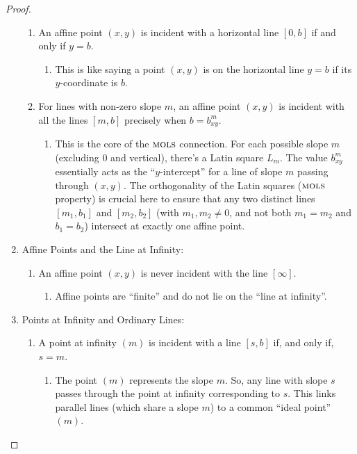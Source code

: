 \begin{proof}
\begin{enumerate}[1.]
\begin{enumerate}[-]
            \item An affine point $(x, y)$ is incident with a horizontal line $[0, b]$ if and only if $y = b$.
            \begin{enumerate}[$\to$]
                \item This is like saying a point $(x,y)$ is on the horizontal line $y=b$ if its $y$-coordinate is $b$.
            \end{enumerate}
            \item For lines with non-zero slope $m$, an affine point $(x, y)$ is incident with all the lines $[m, b]$ precisely when $b = b^m_{xy}$.
            \begin{enumerate}[$\to$]
                \item This is the core of the $\operatorname{\textsc{mols}}$ connection. For each possible slope $m$ (excluding 0 and vertical), there's a Latin square $L_m$. The value $b^m_{xy}$ essentially acts as the ``$y$-intercept'' for a line of slope $m$ passing through $(x, y)$. The orthogonality of the Latin squares ($\operatorname{\textsc{mols}}$ property) is crucial here to ensure that any two distinct lines $[m_1, b_1]$ and $[m_2, b_2]$ (with $m_1, m_2 \ne 0$, and not both $m_1=m_2$ and $b_1=b_2$) intersect at exactly one affine point.
            \end{enumerate}
        \end{enumerate}
        \item Affine Points and the Line at Infinity:
        \begin{enumerate}[-]
            \item An affine point $(x, y)$ is never incident with the line $[\infty]$.
            \begin{enumerate}[$\to$]
                \item Affine points are ``finite'' and do not lie on the ``line at infinity''.
            \end{enumerate}
        \end{enumerate}
        \item Points at Infinity and Ordinary Lines:
        \begin{enumerate}[-]
            \item A point at infinity $(m)$ is incident with a line $[s,b]$ if, and only if, $s = m$.
            \begin{enumerate}[$\to$]
                \item The point $(m)$ represents the slope $m$. So, any line with slope $s$ passes through the point at infinity corresponding to $s$. This links parallel lines (which share a slope $m$) to a common ``ideal point''~$(m)$.

\end{enumerate}
\end{enumerate}
\end{enumerate}
\end{proof}

